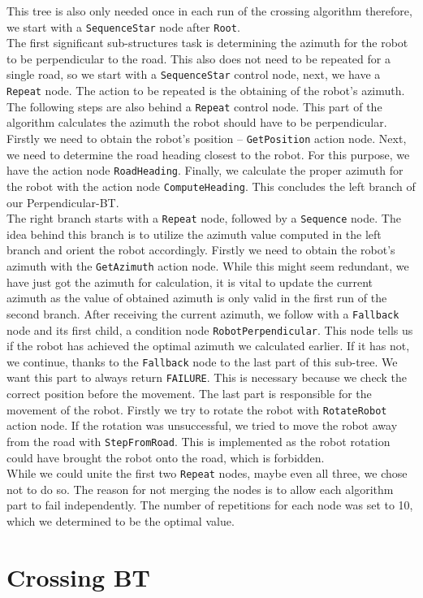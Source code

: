     This tree is also only needed once in each run of the crossing algorithm therefore, we start with a \texttt{SequenceStar} node after \texttt{Root}.\\
    The first significant sub-structures task is determining the azimuth for the robot to be perpendicular to the road. This also does not need to be repeated for a single road, so we start with a \texttt{SequenceStar} control node, next, we have a \texttt{Repeat} node. The action to be repeated is the obtaining of the robot's azimuth. The following steps are also behind a \texttt{Repeat} control node. This part of the algorithm calculates the azimuth the robot should have to be perpendicular. Firstly we need to obtain the robot's position -- \texttt{GetPosition} action node. Next, we need to determine the road heading closest to the robot. For this purpose, we have the action node \texttt{RoadHeading}. Finally, we calculate the proper azimuth for the robot with the action node \texttt{ComputeHeading}. This concludes the left branch of our Perpendicular-BT.\\
    The right branch starts with a \texttt{Repeat} node, followed by a \texttt{Sequence} node. The idea behind this branch is to utilize the azimuth value computed in the left branch and orient the robot accordingly. Firstly we need to obtain the robot's azimuth with the \texttt{GetAzimuth} action node. While this might seem redundant, we have just got the azimuth for calculation, it is vital to update the current azimuth as the value of obtained azimuth is only valid in the first run of the second branch. After receiving the current azimuth, we follow with a \texttt{Fallback} node and its first child, a condition node \texttt{RobotPerpendicular}. This node tells us if the robot has achieved the optimal azimuth we calculated earlier. If it has not, we continue, thanks to the \texttt{Fallback} node to the last part of this sub-tree. We want this part to always return \texttt{FAILURE}. This is necessary because we check the correct position before the movement. The last part is responsible for the movement of the robot. Firstly we try to rotate the robot with \texttt{RotateRobot} action node. If the rotation was unsuccessful, we tried to move the robot away from the road with \texttt{StepFromRoad}. This is implemented as the robot rotation could have brought the robot onto the road, which is forbidden.\\
    While we could unite the first two \texttt{Repeat} nodes, maybe even all three, we chose not to do so. The reason for not merging the nodes is to allow each algorithm part to fail independently. The number of repetitions for each node was set to 10, which we determined to be the optimal value.

\section{Crossing BT}
\label{sec:Crossing-BT}

